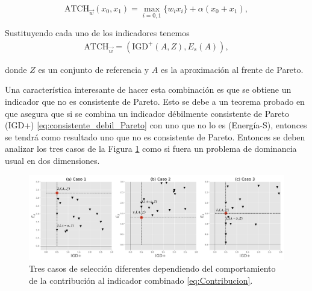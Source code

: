 \begin{equation} \label{eq:ATCH}
    \text{ATCH}_{\vec{w}}(x_0,x_1)=\max_{i=0,1} \{w_ix_i\}+\alpha (x_0+x_1),  
\end{equation}


Sustituyendo cada uno de los indicadores tenemos
\begin{align*}
    \text{ATCH}_{\vec{w}}=({\text{IGD}}^+(A,Z),E_s(A)), \nonumber
\end{align*}


donde $Z$ es un conjunto de referencia y $A$ es la aproximación al frente de Pareto.

Una característica interesante de hacer esta combinación es que se obtiene un indicador que no es consistente de Pareto. Esto se debe a un teorema probado en \cite{falcon-cardonaConstructionParetoCompliantCombined2022} que asegura que si se combina un indicador débilmente consistente de Pareto (IGD+) \eqref{eq:consistente_debil_Pareto} con uno que no lo es (Energía-S), entonces se tendrá como resultado uno que no es consistente de Pareto. Entonces se deben analizar los tres casos de la Figura \ref{fig:casos} como si fuera un problema de dominancia usual en dos dimensiones.

\begin{figure}[H]
    \centering
    \includegraphics[width=\textwidth]{Figuras/casos.pdf}
    \caption[Tres casos para PFI.emoa]{Tres casos de selección diferentes dependiendo del comportamiento de la contribución al indicador combinado \eqref{eq:Contribucion}.}
    \label{fig:casos}
\end{figure}


